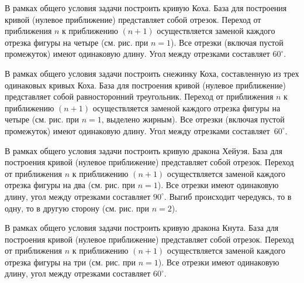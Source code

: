 
\begin{zztask}
В рамках общего условия задачи построить кривую Коха. База для построения кривой
(нулевое приближение) представляет собой отрезок. Переход от приближения
$n$ к приближению $(n+1)$ осуществляется заменой каждого отрезка фигуры на четыре
(см. рис. при $n=1$). Все отрезки (включая пустой промежуток) имеют одинаковую 
длину. Угол между отрезками составляет $60^\circ$.
\par
\end{zztask}


\begin{zztask}
В рамках общего условия задачи построить снежинку Коха, составленную из
трех одинаковых кривых Коха. База для построения кривой (нулевое приближение) 
представляет собой равносторонний треугольник. Переход от приближения
$n$ к приближению $(n+1)$ осуществляется заменой каждого отрезка фигуры на четыре
(см. рис. при $n=1$, выделено жирным). Все отрезки (включая пустой промежуток)
имеют одинаковую длину. Угол между отрезками \mbox{составляет $60^\circ$}.
\par
\end{zztask}


\begin{zztask}
В рамках общего условия задачи построить кривую дракона Хейуэя. База для 
построения кривой (нулевое приближение) представляет собой отрезок. Переход 
от приближения $n$ к приближению $(n+1)$ осуществляется заменой каждого 
отрезка фигуры на два (см. рис. при $n=1$). Все отрезки 
имеют одинаковую длину, угол между отрезками составляет $90^\circ$.
Выгиб происходит чередуясь, то в одну, то в другую сторону (см. рис. при $n=2$).
\par
\end{zztask}



\begin{zztask}
В рамках общего условия задачи построить кривую дракона Кнута. База для 
построения кривой (нулевое приближение) представляет собой отрезок. Переход 
от приближения $n$ к приближению $(n+1)$ осуществляется заменой каждого 
отрезка фигуры на три (см. рис. при $n=1$). Все отрезки 
имеют одинаковую длину, угол между отрезками составляет $60^\circ$.
\par
\end{zztask}

